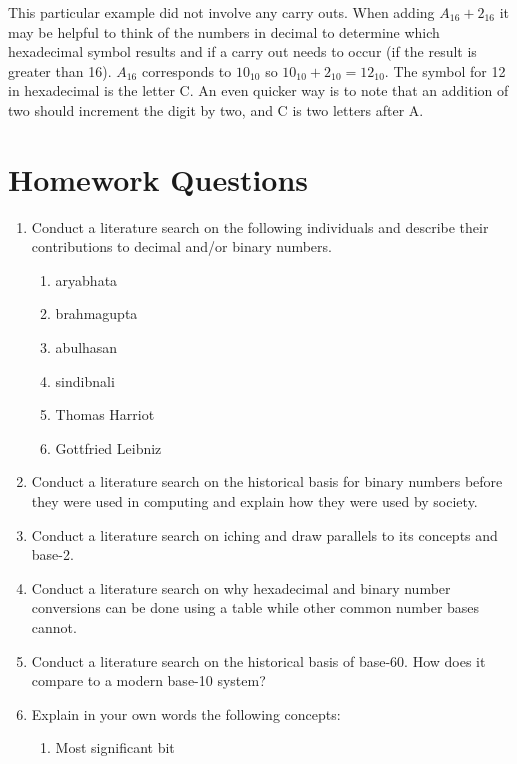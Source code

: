 This particular example did not involve any carry outs. When adding $A_{16} + 2_{16}$ it may 
be helpful to think of the numbers in decimal to determine which hexadecimal symbol results 
and if a carry out needs to occur (if the result is greater than 16). $A_{16}$ corresponds to 
$10_{10}$ so $10_{10}+2_{10}=12_{10}$. The symbol for 12 in hexadecimal is the letter C. An even 
quicker way is to note that an addition of two should increment the digit by two, and C 
is two letters after A. 

\vfill\clearpage
\section*{Homework Questions}

\small
\begin{multicols*}{2}
   \begin{enumerate}[label=\thechapter.\arabic*]
    \item Conduct a literature search on the following individuals and describe their contributions to decimal and/or binary numbers.
        \begin{enumerate}
            \item \gls{aryabhata}
            \item \gls{brahmagupta}
            \item \gls{abulhasan}
            \item \gls{sindibnali}
            \item Thomas Harriot
            \item Gottfried Leibniz
        \end{enumerate}
    \item Conduct a literature search on the historical basis for binary numbers before they were used in %
    computing and explain how they were used by society.
    \item Conduct a literature search on \gls{iching} and draw parallels to its concepts and \gls{base-2}.
    \item Conduct a literature search on why hexadecimal and binary number conversions can be done using a table while other common number bases cannot. 
    \item Conduct a literature search on the historical basis of base-60. How does it compare to a modern base-10 system?
    \item Explain in your own words the following concepts:
    \begin{enumerate}
        \item Most significant bit

\end{enumerate}
\end{enumerate}
\end{multicols*}
